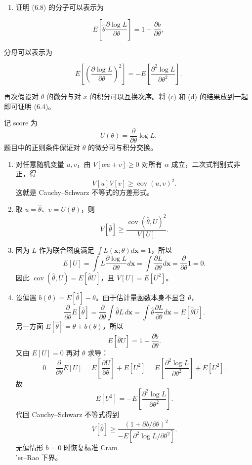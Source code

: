 \begin{question}
\begin{enumerate}[start=4]
\item
  证明 (6.8) 的分子可以表示为
\end{enumerate}

\[
E\left[\hat\theta\frac{\partial\log L}{\partial\theta}\right]=1+\frac{\partial b}{\partial\theta},
\]

分母可以表示为

\[
E\left[\left(\frac{\partial\log L}{\partial\theta}\right)^2\right]
=-E\left[\frac{\partial^2\log L}{\partial\theta^2}\right].
\]

再次假设对 \(\theta\) 的微分与对 \(x\) 的积分可以互换次序。将 (c) 和 (d)
的结果放到一起即可证明 (6.4)。
\begin{solution}
记 score 为
\[
U(\theta)=\frac{\partial}{\partial\theta}\log L.
\]
题目中的正则条件保证对 \(\theta\) 的微分可与积分交换。

\begin{enumerate}
\item 对任意随机变量 \(u,v\)，由
\(V[\alpha u+v]\ge0\) 对所有 \(\alpha\) 成立，二次式判别式非正，得
\[
V[u]V[v]\ge\operatorname{cov}(u,v)^2.
\]
这就是 Cauchy--Schwarz 不等式的方差形式。

\item 取 \(u=\hat\theta\)、\(v=U(\theta)\)，则
\[
V[\hat\theta]\ge
\frac{\operatorname{cov}(\hat\theta,U)^2}{V[U]}.
\]

\item 因为 \(L\) 作为联合密度满足 \(\int L(\mathbf x;\theta)d\mathbf x=1\)，所以
\[
E[U]=\int L\frac{\partial\log L}{\partial\theta}d\mathbf x
=\int\frac{\partial L}{\partial\theta}d\mathbf x
=\frac{\partial}{\partial\theta}1=0.
\]
因此 \(\operatorname{cov}(\hat\theta,U)=E[\hat\theta U]\)，且
\(V[U]=E[U^2]\)。

\item 设偏置 \(b(\theta)=E[\hat\theta]-\theta\)。由于估计量函数本身不显含
\(\theta\)，
\[
\frac{\partial}{\partial\theta}E[\hat\theta]
=\frac{\partial}{\partial\theta}\int\hat\theta L\,d\mathbf x
=\int\hat\theta\frac{\partial L}{\partial\theta}d\mathbf x
=E[\hat\theta U].
\]
另一方面 \(E[\hat\theta]=\theta+b(\theta)\)，所以
\[
E[\hat\theta U]=1+\frac{\partial b}{\partial\theta}.
\]
又由 \(E[U]=0\) 再对 \(\theta\) 求导：
\[
0=\frac{\partial}{\partial\theta}E[U]
=E\left[\frac{\partial U}{\partial\theta}\right]+E[U^2]
=E\left[\frac{\partial^2\log L}{\partial\theta^2}\right]+E[U^2].
\]
故
\[
E[U^2]=-E\left[\frac{\partial^2\log L}{\partial\theta^2}\right].
\]
代回 Cauchy--Schwarz 不等式得到
\[
V[\hat\theta]
\ge
\frac{\left(1+\partial b/\partial\theta\right)^2}
{-E\left[\partial^2\log L/\partial\theta^2\right]}.
\]
无偏情形 \(b=0\) 时恢复标准 Cram\\'{e}r--Rao 下界。
\end{enumerate}
\end{solution}
\end{question}



